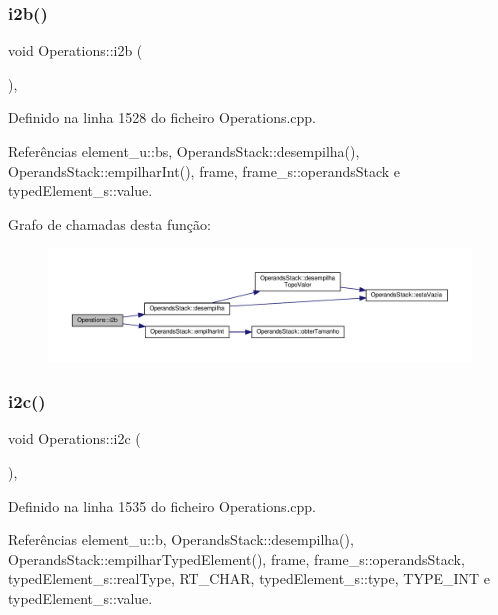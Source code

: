 \subsubsection{\texorpdfstring{i2b()}{i2b()}}
{\footnotesize\ttfamily void Operations\+::i2b (\begin{DoxyParamCaption}{ }\end{DoxyParamCaption})\hspace{0.3cm}{\ttfamily [static]}, {\ttfamily [private]}}



Definido na linha 1528 do ficheiro Operations.\+cpp.



Referências element\+\_\+u\+::bs, Operands\+Stack\+::desempilha(), Operands\+Stack\+::empilhar\+Int(), frame, frame\+\_\+s\+::operands\+Stack e typed\+Element\+\_\+s\+::value.

Grafo de chamadas desta função\+:
\nopagebreak
\begin{figure}[H]
\begin{center}
\leavevmode
\includegraphics[width=350pt]{classOperations_adfe0344bae5a1252330b7324e827ed35_cgraph}
\end{center}
\end{figure}
\mbox{\label{classOperations_a43b01132bf9acf598d0ced8719c194c7}} 
\subsubsection{\texorpdfstring{i2c()}{i2c()}}
{\footnotesize\ttfamily void Operations\+::i2c (\begin{DoxyParamCaption}{ }\end{DoxyParamCaption})\hspace{0.3cm}{\ttfamily [static]}, {\ttfamily [private]}}



Definido na linha 1535 do ficheiro Operations.\+cpp.



Referências element\+\_\+u\+::b, Operands\+Stack\+::desempilha(), Operands\+Stack\+::empilhar\+Typed\+Element(), frame, frame\+\_\+s\+::operands\+Stack, typed\+Element\+\_\+s\+::real\+Type, R\+T\+\_\+\+C\+H\+AR, typed\+Element\+\_\+s\+::type, T\+Y\+P\+E\+\_\+\+I\+NT e typed\+Element\+\_\+s\+::value.

